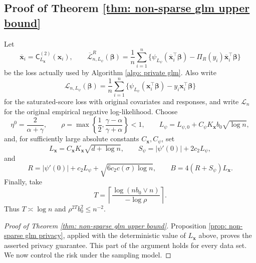 \documentclass[letterpaper,12pt]{article}
\numberwithin{equation}{section}
\theoremstyle{plain}
\numberwithin{Theorem}{section}
\numberwithin{proposition}{section}
\numberwithin{Lemma}{section}
{
	\theoremstyle{definition}
	\newtheorem{Definition}{Definition}
	\newtheorem{example}{Example}
	\numberwithin{example}{section}
	\newtheorem{fact}{Fact}
	\numberwithin{fact}{section}
	\newtheorem{remark}{Remark}
}
\newcommand{\1}{\mathbbm{1}}
\def\bbeta{{\boldsymbol{\beta}}}
\def\L{{\mathcal L}}
\begin{document}
\subsection{Proof of Theorem \ref{thm: non-sparse glm upper bound}} \label{sec: proof of thm: non-sparse glm upper bound}

{Let
\[
\overline{\bm x}_i=\mathsf C_{L_{\bm x}}^{(2)}(\bm x_i),
\qquad
\overline\L_{n,L_\psi}^R(\bbeta)=\frac1n\sum_{i=1}^n
\{\psi_{L_\psi}(\overline{\bm x}_i^\top\bbeta)
-\Pi_R(y_i)\overline{\bm x}_i^\top\bbeta\}
\]
be the loss actually used by Algorithm \ref{algo: private glm}.  Also
write
\[
\L_{n,L_\psi}(\bbeta)=\frac1n\sum_{i=1}^n
\{\psi_{L_\psi}(\bm x_i^\top\bbeta)-y_i\bm x_i^\top\bbeta\}
\]
for the saturated-score loss with original covariates and responses,
and write \(\L_n\) for the original empirical negative log-likelihood.
Choose
\[
\eta^0=\frac{2}{\alpha+\gamma},\qquad
\rho=\max\left\{\frac12,\frac{\gamma-\alpha}{\gamma+\alpha}\right\}<1,\qquad
L_\psi=L_{\psi,0}+C_\psi K_{\bm x}b_0\sqrt{\log n},
\]
and, for sufficiently large absolute constants \(C_{\bm x},C_\psi\), set
\[
L_{\bm x}=C_{\bm x}K_{\bm x}\sqrt{d+\log n},
\qquad
S_\psi=|\psi'(0)|+2c_2L_\psi,
\]
and
\[
R=|\psi'(0)|+c_2L_\psi+\sqrt{6c_2c(\sigma)\log n},
\qquad B=4(R+S_\psi)L_{\bm x}.
\]
Finally, take
\[
T=\left\lceil\frac{\log(nb_0\vee n)}{-\log\rho}\right\rceil.
\]
Thus $T\asymp\log n$ and $\rho^{2T}b_0^2\leq n^{-2}$.

\begin{proof}[Proof of Theorem \ref{thm: non-sparse glm upper bound}]
	Proposition \ref{prop: non-sparse glm privacy}, applied with the
	deterministic value of \(L_{\bm x}\) above, proves the asserted privacy
	guarantee.  This part of the argument holds for every data set.  We now
	control the risk under the sampling model.


\end{proof}}
\end{document}
